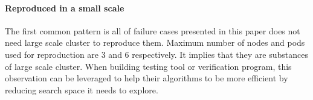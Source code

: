 \paragraph*{Reproduced in a small scale} The first common pattern is all of failure cases presented in this paper does not need large scale cluster to reproduce them. Maximum number of nodes and pods used for reproduction are 3 and 6 respectively. It implies that they are substances of large scale cluster. When building testing tool or verification program, this observation can be leveraged to help their algorithms to be more efficient by reducing search space it needs to explore.


\begin{figure}[t]
    \centering

\end{figure}
